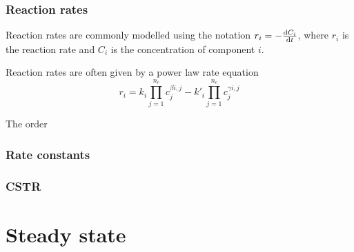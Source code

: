 \subsubsection{Reaction rates}
Reaction rates are commonly modelled using the notation
$r_i=-\frac{\mathrm{d}C_i}{\mathrm{d}t}$, where $r_i$ is the reaction rate and $C_i$ is the
concentration of component $i$.  

Reaction rates are often given by a power law rate equation
\begin{equation}
  r_i = k_i \prod_{j=1}^{n_c}c_j^{\beta{i,j}} - k'_i\prod_{j=1}^{n_c}c_j^{\gamma{i,j}}
\end{equation}

The order 

\subsubsection{Rate constants}

\subsubsection{CSTR}

\section{Steady state}


